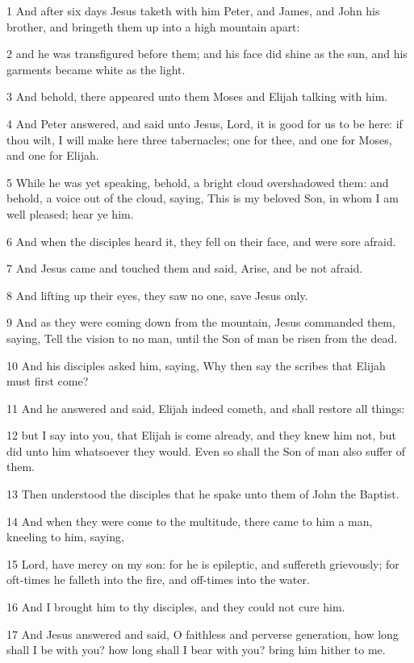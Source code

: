 \par 1 And after six days Jesus taketh with him Peter, and James, and John his brother, and bringeth them up into a high mountain apart:
\par 2 and he was transfigured before them; and his face did shine as the sun, and his garments became white as the light.
\par 3 And behold, there appeared unto them Moses and Elijah talking with him.
\par 4 And Peter answered, and said unto Jesus, Lord, it is good for us to be here: if thou wilt, I will make here three tabernacles; one for thee, and one for Moses, and one for Elijah.
\par 5 While he was yet speaking, behold, a bright cloud overshadowed them: and behold, a voice out of the cloud, saying, This is my beloved Son, in whom I am well pleased; hear ye him.
\par 6 And when the disciples heard it, they fell on their face, and were sore afraid.
\par 7 And Jesus came and touched them and said, Arise, and be not afraid.
\par 8 And lifting up their eyes, they saw no one, save Jesus only.
\par 9 And as they were coming down from the mountain, Jesus commanded them, saying, Tell the vision to no man, until the Son of man be risen from the dead.
\par 10 And his disciples asked him, saying, Why then say the scribes that Elijah must first come?
\par 11 And he answered and said, Elijah indeed cometh, and shall restore all things:
\par 12 but I say into you, that Elijah is come already, and they knew him not, but did unto him whatsoever they would. Even so shall the Son of man also suffer of them.
\par 13 Then understood the disciples that he spake unto them of John the Baptist.
\par 14 And when they were come to the multitude, there came to him a man, kneeling to him, saying,
\par 15 Lord, have mercy on my son: for he is epileptic, and suffereth grievously; for oft-times he falleth into the fire, and off-times into the water.
\par 16 And I brought him to thy disciples, and they could not cure him.
\par 17 And Jesus answered and said, O faithless and perverse generation, how long shall I be with you? how long shall I bear with you? bring him hither to me.

